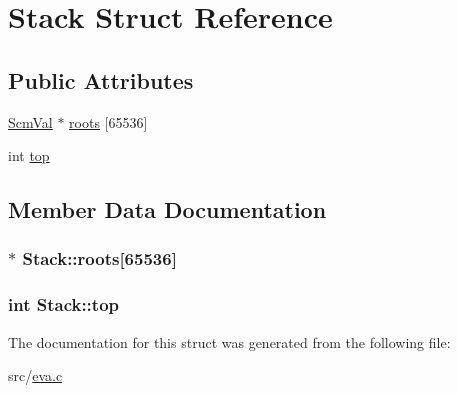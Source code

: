 \hypertarget{struct_stack}{\section{Stack Struct Reference}
\label{struct_stack}
}
\subsection*{Public Attributes}
\begin{DoxyCompactItemize}
\item 
\hyperlink{eva_8h_a9e754b130d398cb7a4000c8c7a046427}{Scm\-Val} $\ast$ \hyperlink{struct_stack_a46543bb94c20a9d308d7bfa64ed527e4}{roots} \mbox{[}65536\mbox{]}
\item 
int \hyperlink{struct_stack_ad62fb36816185f3eef3a6f735a61f54a}{top}
\end{DoxyCompactItemize}


\subsection{Member Data Documentation}
\hypertarget{struct_stack_a46543bb94c20a9d308d7bfa64ed527e4}{
\subsubsection[{roots}]{$\ast$ Stack\-::roots\mbox{[}65536\mbox{]}}}\label{struct_stack_a46543bb94c20a9d308d7bfa64ed527e4}
\hypertarget{struct_stack_ad62fb36816185f3eef3a6f735a61f54a}{
\subsubsection[{top}]{\setlength{\rightskip}{0pt plus 5cm}int Stack\-::top}}\label{struct_stack_ad62fb36816185f3eef3a6f735a61f54a}


The documentation for this struct was generated from the following file\-:\begin{DoxyCompactItemize}
\item 
src/\hyperlink{eva_8c}{eva.\-c}\end{DoxyCompactItemize}

